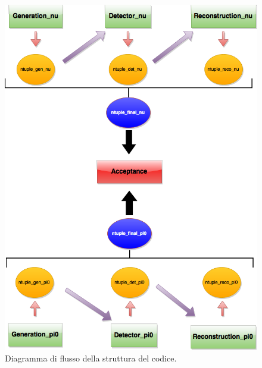 \documentclass[8pt]{extarticle}
\begin{document}
\begin{figure}
\begin{center}
\includegraphics[scale=0.4]{structure_rare}
\caption{Diagramma di flusso della struttura del codice.}
\label{fig:structure}
\end{center}
\end{figure}
\end{document}

